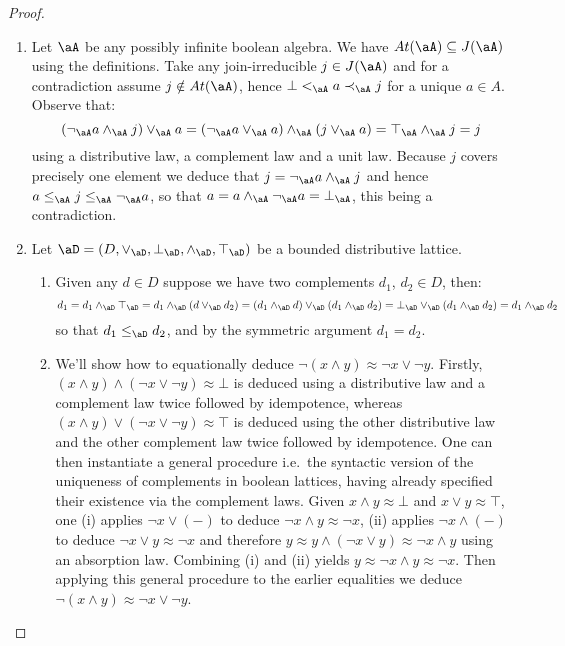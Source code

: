 \documentclass{article}
\begin{document}
\begin{proof}
\begin{enumerate}
\item
Let $\aA$ be any possibly infinite boolean algebra. We have $At(\aA) \subseteq J(\aA)$ using the definitions. Take any join-irreducible $j \in J(\aA)$ and for a contradiction assume $j \notin At(\aA)$, hence $\bot <_\aA a \prec_\aA j$ for a unique $a \in A$. Observe that:
\[
(\neg_\aA a \land_\aA j) \lor_\aA a
= (\neg_\aA a \lor_\aA a) \land_\aA (j \lor_\aA a)
= \top_\aA \land_\aA j
= j
\]
using a distributive law, a complement law and a unit law. Because $j$ covers precisely one element we deduce that $j = \neg_\aA a \land_\aA j$ and hence $a \leq_\aA j \leq_\aA \neg_\aA a$, so that $a = a \land_\aA \neg_\aA a = \bot_\aA$, this being a contradiction.

\item
Let $\aD = (D,\lor_\aD,\bot_\aD,\land_\aD,\top_\aD)$ be a bounded distributive lattice.

\begin{enumerate}
\item
Given any $d \in D$ suppose we have two complements $d_1$, $d_2 \in D$, then:
\[
d_1 
= d_1 \land_\aD \top_\aD 
= d_1 \land_\aD (d \lor_\aD d_2)
= (d_1 \land_\aD d) \lor_\aD (d_1 \land_\aD d_2)
= \bot_\aD \lor_\aD (d_1 \land_\aD d_2)
= d_1 \land_\aD d_2
\]
so that $d_1 \leq_\aD d_2$, and by the symmetric argument $d_1 = d_2$.

\item
We'll show how to equationally deduce $\neg(x\land y) \approx \neg x \lor \neg y$. Firstly, $(x \land y) \land (\neg x \lor \neg y) \approx \bot$ is deduced  using a distributive law and a complement law twice followed by idempotence, whereas $(x \land y) \lor (\neg x \lor \neg y) \approx \top$ is deduced using the other distributive law and the other complement law twice followed by idempotence. One can then instantiate a general procedure i.e.\ the syntactic version of the uniqueness of complements in boolean lattices, having already specified their existence via the complement laws. Given $x \land y \approx \bot$ and $x \lor y  \approx \top$, one (i) applies $\neg x \lor (-)$ to deduce $\neg x \land y \approx \neg x$, (ii) applies $\neg x \land (-)$ to deduce $\neg x \lor y \approx \neg x$ and therefore $y \approx y \land (\neg x \lor y) \approx \neg x \land y$ using an absorption law. Combining (i) and (ii) yields $y \approx \neg x \land y \approx \neg x$. Then applying this general procedure to the earlier equalities we deduce $\neg(x\land y) \approx \neg x \lor \neg y$.
\end{enumerate}




\end{enumerate}
\end{proof}
\end{document}
